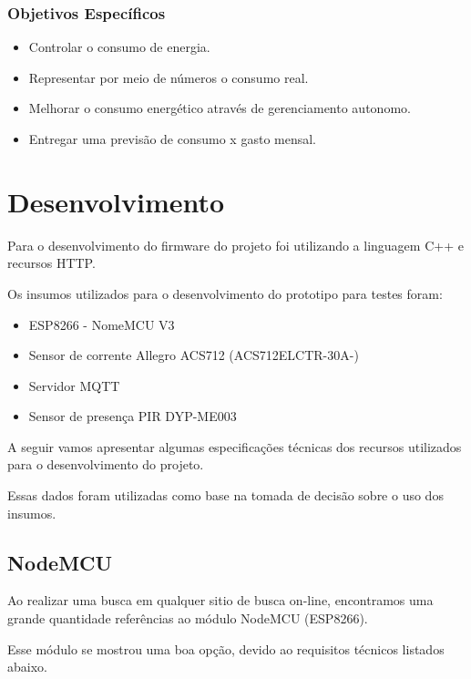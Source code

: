 \documentclass[openright]{normas-utf-tex} %
\begin{document}
\subsection{Objetivos Específicos}

\begin{itemize}
	\item Controlar o consumo de energia.
	\item Representar por meio de números o consumo real. 
	\item Melhorar o consumo energético através de gerenciamento autonomo.
	\item Entregar uma previsão de consumo x gasto mensal.
\end{itemize}


\chapter{Desenvolvimento}
\label{chap:desenv}

 
Para o desenvolvimento do firmware do projeto foi utilizando a linguagem C++   \cite{Altabooks} e recursos HTTP.

Os insumos utilizados para o desenvolvimento do prototipo para testes foram:

\begin{itemize}
       	\item ESP8266 - NomeMCU V3
        \item Sensor de corrente Allegro ACS712 (ACS712ELCTR-30A-)
        \item Servidor MQTT
        \item Sensor de presença PIR DYP-ME003
\end{itemize}

A seguir vamos apresentar algumas especificações técnicas dos recursos utilizados para o desenvolvimento do projeto.

Essas dados foram utilizadas como base na tomada de decisão sobre o uso dos insumos. 

\section{NodeMCU}
Ao realizar uma busca em qualquer sitio de busca on-line, encontramos uma grande quantidade referências ao módulo NodeMCU (ESP8266).

Esse módulo se mostrou uma boa opção, devido ao requisitos técnicos listados abaixo.
\end{document}
